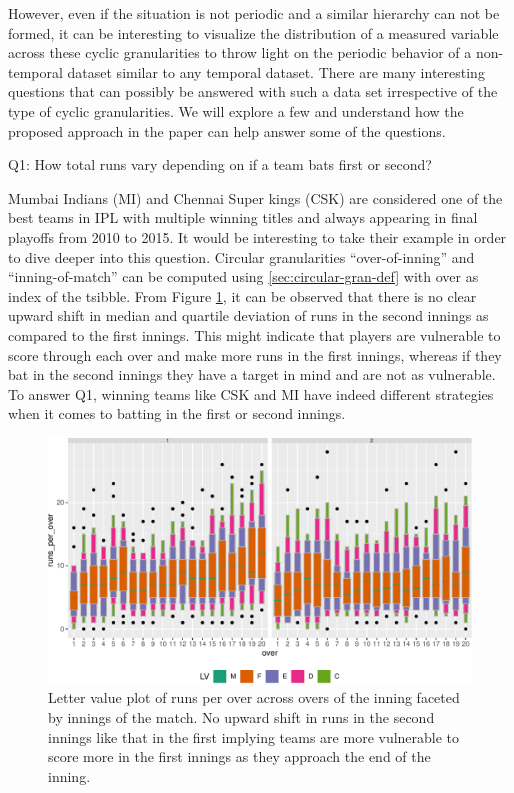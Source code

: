\documentclass[12pt]{article}
\begin{document}
However, even if the situation is not periodic and a similar hierarchy can not be formed, it can be interesting to visualize the distribution of a measured variable across these cyclic granularities to throw light on the periodic behavior of a non-temporal dataset similar to any temporal dataset. There are many interesting questions that can possibly be answered with such a data set irrespective of the type of cyclic granularities. We will explore a few and understand how the proposed approach in the paper can help answer some of the questions.

Q1: How total runs vary depending on if a team bats first or second?

Mumbai Indians (MI) and Chennai Super kings (CSK) are considered one of the best teams in IPL with multiple winning titles and always appearing in final playoffs from 2010 to 2015. It would be interesting to take their example in order to dive deeper into this question. Circular granularities ``over-of-inning'' and ``inning-of-match'' can be computed using \ref{sec:circular-gran-def} with over as index of the tsibble. From Figure \ref{fig:cricex}, it can be observed that there is no clear upward shift in median and quartile deviation of runs in the second innings as compared to the first innings. This might indicate that players are vulnerable to score through each over and make more runs in the first innings, whereas if they bat in the second innings they have a target in mind and are not as vulnerable. To answer Q1, winning teams like CSK and MI have indeed different strategies when it comes to batting in the first or second innings.

\begin{figure}

{\centering \includegraphics[width=\textwidth]{figure/cricex-1} 

}

\caption{Letter value plot of runs per over across overs of the inning faceted by innings of the match. No upward shift in runs in the second innings like that in the first implying teams are more vulnerable to score more in the first innings as they approach the end of the inning.}\label{fig:cricex}
\end{figure}
\end{document}
